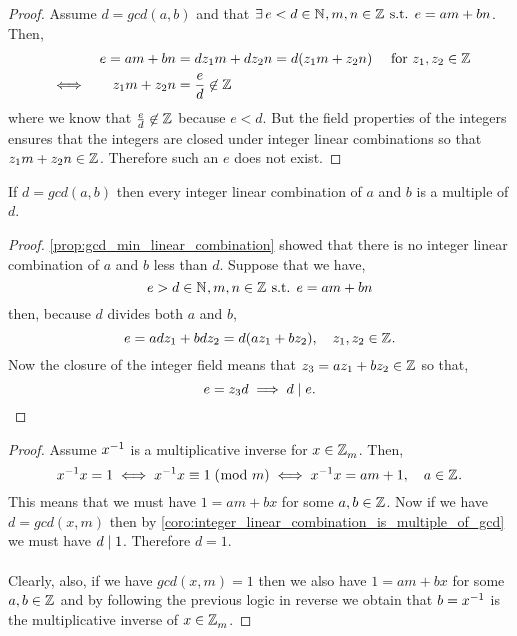 \documentclass[../MathsNotesBase.tex]{subfiles}
\begin{document}
{		
		\begin{proof}
			Assume $d = gcd(a,b)$ and that ${ \exists\, e < d \in \mathbb{N}^{}, m,n \in \mathbb{Z}^{} \text{ s.t. } e = am + bn }$. Then,
			\begin{align*}
				&&e = am + bn &= dz_1m + dz_2n = d(z_1m + z_2n) \hspace{10pt} \text{ for } z_1, z_2 \in \mathbb{Z}^{} \\
				&\iff &z_1m + z_2n &= \frac{e}{d} \not\in \mathbb{Z}^{}
			\end{align*}
			where we know that ${ \frac{e}{d} \not\in \mathbb{Z}^{} }$ because ${ e < d }$. But the field properties of the integers ensures that the integers are closed under integer linear combinations so that $z_1m + z_2n \in \mathbb{Z}^{}$. Therefore such an $e$ does not exist.
		\end{proof}
	
		\begin{corollary}
			\label{coro:integer_linear_combination_is_multiple_of_gcd}
			If $d = gcd(a, b)$ then every integer linear combination of $a$ and $b$ is a multiple of $d$.
		\end{corollary}
		\begin{proof}
			\autoref{prop:gcd_min_linear_combination} showed that there is no integer linear combination of $a$ and $b$ less than $d$. Suppose that we have,
			\[ e > d  \in \mathbb{N}^{}, m,n \in \mathbb{Z}^{} \text{ s.t. } e = am + bn \]
			then, because $d$ divides both $a$ and $b$,
			\[ e = adz_1 + bdz_2 = d(az_1 + bz_2), \hspace{10pt} z_1,z_2 \in \mathbb{Z}^{}. \]
			Now the closure of the integer field means that ${ z_3 = az_1 + bz_2 \in \mathbb{Z}^{} }$ so that,
			\[ e = z_3d \implies d \mid e. \]
		\end{proof}
	
		\begin{proof}
			Assume ${ {x}^{-1} }$ is a multiplicative inverse for ${ x \in \mathbb{Z}^{}_m }$. Then,
			\[ {x}^{-1}x = 1 \iff {x}^{-1}x \equiv 1 \;(\bmod\; m) \iff {x}^{-1}{x} = am + 1, \hspace{10pt} a \in \mathbb{Z}^{}. \]
			This means that we must have ${ 1 = am + bx }$ for some ${ a,b \in \mathbb{Z}^{} }$. Now if we have ${ d = gcd(x,m) }$ then by \autoref{coro:integer_linear_combination_is_multiple_of_gcd} we must have ${ d \mid 1 }$. Therefore ${ d = 1 }$.\\\\
			Clearly, also, if we have ${ gcd(x,m) = 1 }$ then we also have ${ 1 = am + bx }$ for some ${ a,b \in \mathbb{Z}^{} }$ and by following the previous logic in reverse we obtain that ${ b = {x}^{-1} }$ is the multiplicative inverse of ${ x \in \mathbb{Z}^{}_m }$.
		\end{proof}
	
}
\end{document}
